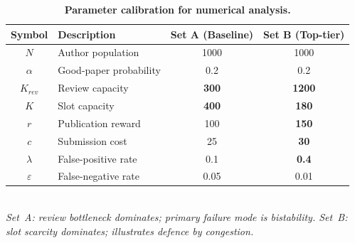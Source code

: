 \documentclass{article}
\begin{document}
\begin{table}[hbt!]
    \centering
    \caption{\textbf{Parameter calibration for numerical analysis.}}
    \label{tab:calibration}
    \renewcommand{\arraystretch}{1.2}
    \begin{tabular}{clcc}
        \toprule
        \textbf{Symbol} & \textbf{Description} & \textbf{Set A (Baseline)} & \textbf{Set B (Top-tier)} \\
        \midrule
        $N$          & Author population       & 1000          & 1000 \\
        $\alpha$     & Good-paper probability  & 0.2           & 0.2  \\
        \midrule
        $K_{rev}$    & Review capacity         & \textbf{300}  & \textbf{1200} \\
        $K$          & Slot capacity           & \textbf{400}  & \textbf{180}  \\
        \midrule
        $r$          & Publication reward      & 100           & \textbf{150}  \\
        $c$          & Submission cost         & 25            & \textbf{30}   \\
        $\lambda$    & False-positive rate     & 0.1           & \textbf{0.4}  \\
        $\varepsilon$& False-negative rate     & 0.05          & 0.01          \\
        \bottomrule
    \end{tabular}
    \smallskip\\
    \footnotesize{\textit{Set~A: review bottleneck dominates; primary failure mode is bistability.
    Set~B: slot scarcity dominates; illustrates defence by congestion.}}
\end{table}
\end{document}
